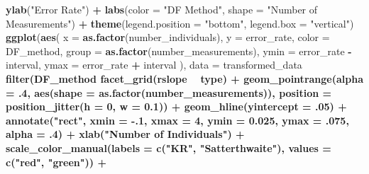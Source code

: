 \documentclass[12pt, twoside]{amherstthesis}
\newenvironment{Shaded}{\begin{snugshade}}{\end{snugshade}}
\newcommand{\DataTypeTok}[1]{\textcolor[rgb]{0.13,0.29,0.53}{#1}}
\newcommand{\DecValTok}[1]{\textcolor[rgb]{0.00,0.00,0.81}{#1}}
\newcommand{\FloatTok}[1]{\textcolor[rgb]{0.00,0.00,0.81}{#1}}
\newcommand{\KeywordTok}[1]{\textcolor[rgb]{0.13,0.29,0.53}{\textbf{#1}}}
\newcommand{\NormalTok}[1]{#1}
\newcommand{\OperatorTok}[1]{\textcolor[rgb]{0.81,0.36,0.00}{\textbf{#1}}}
\newcommand{\StringTok}[1]{\textcolor[rgb]{0.31,0.60,0.02}{#1}}
\begin{document}
\begin{Shaded}
\begin{Highlighting}[]
{{{{{{{{{{{{{\StringTok{  }\KeywordTok{ylab}\NormalTok{(}\StringTok{"Error Rate"}\NormalTok{) }\OperatorTok{+}
\StringTok{  }\KeywordTok{labs}\NormalTok{(}\DataTypeTok{color =} \StringTok{"DF Method"}\NormalTok{, }\DataTypeTok{shape =} \StringTok{"Number of Measurements"}\NormalTok{) }\OperatorTok{+}
\StringTok{  }\KeywordTok{theme}\NormalTok{(}\DataTypeTok{legend.position =} \StringTok{"bottom"}\NormalTok{, }\DataTypeTok{legend.box =} \StringTok{"vertical"}\NormalTok{)}
\KeywordTok{ggplot}\NormalTok{(}\KeywordTok{aes}\NormalTok{(}
  \DataTypeTok{x =} \KeywordTok{as.factor}\NormalTok{(number_individuals), }\DataTypeTok{y =}\NormalTok{ error_rate,}
  \DataTypeTok{color =}\NormalTok{ DF_method, }\DataTypeTok{group =} \KeywordTok{as.factor}\NormalTok{(number_measurements), }
  \DataTypeTok{ymin =}\NormalTok{ error_rate }\OperatorTok{-}\StringTok{ }\NormalTok{interval, }\DataTypeTok{ymax =}\NormalTok{ error_rate }\OperatorTok{+}\StringTok{ }\NormalTok{interval}
\NormalTok{), }\DataTypeTok{data =}\NormalTok{ transformed_data }\OperatorTok{%>%}\StringTok{ }
\StringTok{  }\KeywordTok{filter}\NormalTok{(DF_method }\OperatorTok{%in%}\StringTok{ }\KeywordTok{c}\NormalTok{(}\StringTok{"KR_t1err_1"}\NormalTok{, }\StringTok{"S_t1err_1"}\NormalTok{))) }\OperatorTok{+}
\StringTok{  }\KeywordTok{facet_grid}\NormalTok{(rslope }\OperatorTok{~}\StringTok{ }\NormalTok{type) }\OperatorTok{+}
\StringTok{  }\KeywordTok{geom_pointrange}\NormalTok{(}\DataTypeTok{alpha =} \FloatTok{.4}\NormalTok{, }\KeywordTok{aes}\NormalTok{(}\DataTypeTok{shape =} \KeywordTok{as.factor}\NormalTok{(number_measurements)), }
                  \DataTypeTok{position =} \KeywordTok{position_jitter}\NormalTok{(}\DataTypeTok{h =} \DecValTok{0}\NormalTok{, }\DataTypeTok{w =} \FloatTok{0.1}\NormalTok{)) }\OperatorTok{+}
\StringTok{  }\KeywordTok{geom_hline}\NormalTok{(}\DataTypeTok{yintercept =} \FloatTok{.05}\NormalTok{) }\OperatorTok{+}
\StringTok{  }\KeywordTok{annotate}\NormalTok{(}\StringTok{"rect"}\NormalTok{, }\DataTypeTok{xmin =} \FloatTok{-.1}\NormalTok{, }\DataTypeTok{xmax =} \DecValTok{4}\NormalTok{, }\DataTypeTok{ymin =} \FloatTok{0.025}\NormalTok{, }\DataTypeTok{ymax =} \FloatTok{.075}\NormalTok{, }
           \DataTypeTok{alpha =} \FloatTok{.4}\NormalTok{) }\OperatorTok{+}
\StringTok{  }\KeywordTok{xlab}\NormalTok{(}\StringTok{"Number of Individuals"}\NormalTok{) }\OperatorTok{+}
\StringTok{  }\KeywordTok{scale_color_manual}\NormalTok{(}\DataTypeTok{labels =} \KeywordTok{c}\NormalTok{(}\StringTok{"KR"}\NormalTok{, }\StringTok{"Satterthwaite"}\NormalTok{), }
                     \DataTypeTok{values =} \KeywordTok{c}\NormalTok{(}\StringTok{"red"}\NormalTok{, }\StringTok{"green"}\NormalTok{)) }\OperatorTok{+}
}}}}}}}}}}}}}}}
\end{Highlighting}
\end{Shaded}
\end{document}
